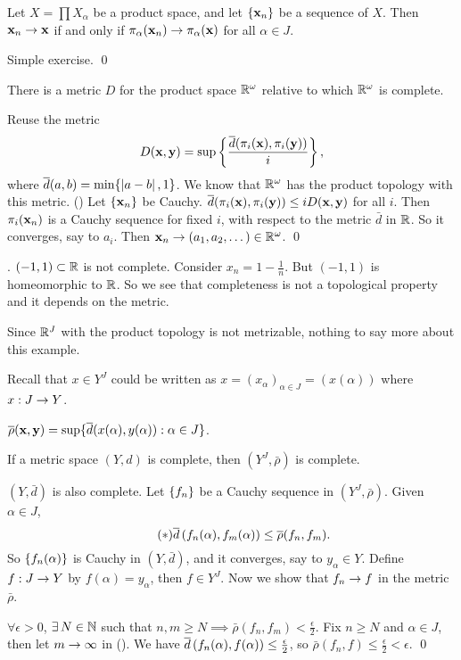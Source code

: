 \rmk {} Let \(X = \prod X_\alpha\) be a product space, and let \(\seq{\bf{x}_n}\) be a sequence of \(X\). Then \(\bf{x}_n \ra \bf{x}\) if and only if \(\pi_\alpha(\bf{x}_n) \ra \pi_\alpha(\bf{x})\) for all \(\alpha \in J\).

\pf Simple exercise. \qed

 There is a metric \(D\) for the product space \(\R^\omega\) relative to which \(\R^\omega\) is complete.

\pf Reuse the metric
\[
    D(\bf{x}, \bf{y}) = \sup \left\{ \frac{\bar{d}(\pi_i (\bf{x}), \pi_i(\bf{y}))}{i}\right\},
\]
where \(\bar{d}(a, b) = \min\{\abs{a - b}, 1\}\). We know that \(\R^\omega\) has the product topology with this metric. () Let \(\seq{\bf{x}_n}\) be Cauchy. \(\bar{d}(\pi_i(\bf{x}), \pi_i(\bf{y})) \leq i D(\bf{x}, \bf{y})\) for all \(i\). Then \(\pi_i(\bf{x}_n)\) is a Cauchy sequence for fixed \(i\), with respect to the metric \(\bar{d}\) in \(\R\). So it converges, say to \(a_i\). Then \(\bf{x}_n \ra (a_1, a_2, \dots) \in \R^\omega\). \qed

\ex. \((-1, 1) \subset \R\) is not complete. Consider \(x_n = 1 - \frac{1}{n}\). But \((-1, 1)\) is homeomorphic to \(\R\). So we see that completeness is not a topological property and it depends on the metric.

Since \(\R^J\) with the product topology is not metrizable, nothing to say more about this example.

\notation Recall that \(x \in Y^J\) could be written as \(x = (x_\alpha)_{\alpha \in J} = (x(\alpha))\) where \(x : J \ra Y\).

\recall \(\bar{\rho}(\bf{x}, \bf{y}) = \sup\{\bar{d}(x(\alpha), y(\alpha)) : \alpha \in J\}\).

 If a metric space \((Y, d)\) is complete, then \((Y^J, \bar{\rho})\) is complete.

\pf \((Y, \bar{d})\) is also complete. Let \(\seq{f_n}\) be a Cauchy sequence in \((Y^J, \bar{\rho})\). Given \(\alpha \in J\),
\[ \tag{\mast}
    \bar{d}\paren{f_n(\alpha), f_m(\alpha)} \leq \bar{\rho}(f_n, f_m).
\]
So \(\seq{f_n(\alpha)}\) is Cauchy in \((Y, \bar{d})\), and it converges, say to \(y_\alpha \in Y\). Define \(f : J \ra Y\) by \(f(\alpha) = y_\alpha\), then \(f \in Y^J\). Now we show that \(f_n \ra f\) in the metric \(\bar{\rho}\).

\(\forall \epsilon > 0\), \(\exists N \in \N\) such that \(n,m \geq N \implies \bar{\rho}(f_n, f_m) < \frac{\epsilon}{2}\). Fix \(n \geq N\) and \(\alpha \in J\), then let \(m \ra \infty\) in (\mast). We have \(\bar{d}\paren{f_n(\alpha), f(\alpha)} \leq \frac{\epsilon}{2}\), so \(\bar{\rho}(f_n, f) \leq \frac{\epsilon}{2} < \epsilon\). \qed

\pagebreak
